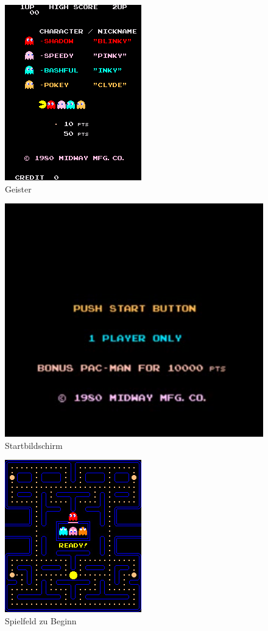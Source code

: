 \documentclass[a4paper, 11pt]{article}
\begin{document}
\begin{figure}[ht!]
	\centering
	\includegraphics[scale=1]{PacManUebersicht}
	\caption{Geister\cite{MuseumPacMan}}
	\label{PacManGeister}
\end{figure}

\begin{figure}
	\centering
	\includegraphics[scale=0.3]{PacManPushStartButton}
	\caption{Startbildschirm\cite{YoutubePacMan}}
	\label{PacManPushStartButton}
\end{figure}

\begin{figure}[ht!]
	\centering
	\includegraphics[scale=1]{PacManStartPic}
	\caption{Spielfeld zu Beginn\cite{MuseumPacMan}}
	\label{PacManStart}
\end{figure}
\end{document}
